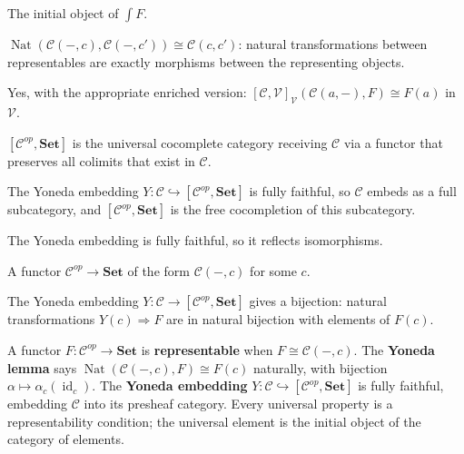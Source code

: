 \begin{exercisesbox}
\begin{qa}
       {The initial object of $\int F$.}

       {$\operatorname{Nat}(\mathcal{C}(-,c), \mathcal{C}(-,c')) \cong \mathcal{C}(c,c')$:
        natural transformations between representables are exactly morphisms
        between the representing objects.}

       {Yes, with the appropriate enriched version: $[\mathcal{C},\mathcal{V}]_\mathcal{V}
        (\mathcal{C}(a,-), F) \cong F(a)$ in $\mathcal{V}$.}

       {$[\mathcal{C}^{op},\mathbf{Set}]$ is the universal cocomplete category receiving
        $\mathcal{C}$ via a functor that preserves all colimits that exist in $\mathcal{C}$.}

       {The Yoneda embedding $Y : \mathcal{C} \hookrightarrow [\mathcal{C}^{op},\mathbf{Set}]$
        is fully faithful, so $\mathcal{C}$ embeds as a full subcategory, and
        $[\mathcal{C}^{op},\mathbf{Set}]$ is the free cocompletion of this subcategory.}

       {The Yoneda embedding is fully faithful, so it reflects isomorphisms.}

       {A functor $\mathcal{C}^{op} \to \mathbf{Set}$ of the form $\mathcal{C}(-,c)$
        for some $c$.}

       {The Yoneda embedding $Y : \mathcal{C} \to [\mathcal{C}^{op}, \mathbf{Set}]$
        gives a bijection: natural transformations $Y(c) \Rightarrow F$ are in
        natural bijection with elements of $F(c)$.}
\end{qa}
\end{exercisesbox}

\begin{summarybox}
A functor $F : \mathcal{C}^{op} \to \mathbf{Set}$ is \textbf{representable} when
$F \cong \mathcal{C}(-,c)$. The \textbf{Yoneda lemma} says
$\operatorname{Nat}(\mathcal{C}(-,c), F) \cong F(c)$ naturally, with bijection
$\alpha \mapsto \alpha_c(\operatorname{id}_c)$. The \textbf{Yoneda embedding}
$Y : \mathcal{C} \hookrightarrow [\mathcal{C}^{op}, \mathbf{Set}]$ is fully faithful,
embedding $\mathcal{C}$ into its presheaf category. Every universal property is a
representability condition; the universal element is the initial object of the
category of elements.
\end{summarybox}

